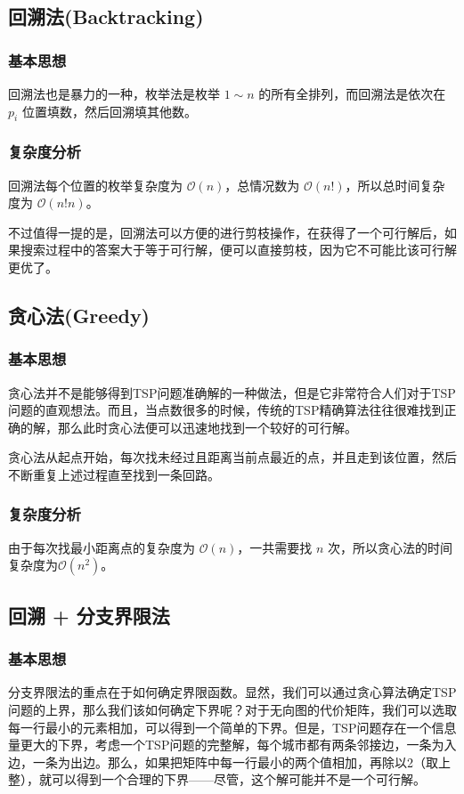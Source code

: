 \documentclass[lang=cn,11pt,a4paper]{elegantpaper}
\begin{document}
\subsection{回溯法(Backtracking)}
\subsubsection{基本思想}
回溯法也是暴力的一种，枚举法是枚举 $1 \sim n$ 的所有全排列，而回溯法是依次在 $p_i$ 位置填数，然后回溯填其他数。

\subsubsection{复杂度分析}
回溯法每个位置的枚举复杂度为 $\mathcal{O}\left(n\right)$，总情况数为 $\mathcal{O}\left(n!\right)$，所以总时间复杂度为 $\mathcal{O}\left(n!n\right)$。

不过值得一提的是，回溯法可以方便的进行剪枝操作，在获得了一个可行解后，如果搜索过程中的答案大于等于可行解，便可以直接剪枝，因为它不可能比该可行解更优了。


\subsection{贪心法(Greedy)}
\subsubsection{基本思想}
贪心法并不是能够得到TSP问题准确解的一种做法，但是它非常符合人们对于TSP问题的直观想法。而且，当点数很多的时候，传统的TSP精确算法往往很难找到正确的解，那么此时贪心法便可以迅速地找到一个较好的可行解。

贪心法从起点开始，每次找未经过且距离当前点最近的点，并且走到该位置，然后不断重复上述过程直至找到一条回路。
\subsubsection{复杂度分析}
由于每次找最小距离点的复杂度为 $\mathcal{O}\left(n\right)$，一共需要找 $n$ 次，所以贪心法的时间复杂度为$\mathcal{O}\left(n^2\right)$。


\subsection{回溯 + 分支界限法}
\subsubsection{基本思想}
分支界限法的重点在于如何确定界限函数。显然，我们可以通过贪心算法确定TSP问题的上界，那么我们该如何确定下界呢？对于无向图的代价矩阵，我们可以选取每一行最小的元素相加，可以得到一个简单的下界。但是，TSP问题存在一个信息量更大的下界，考虑一个TSP问题的完整解，每个城市都有两条邻接边，一条为入边，一条为出边。那么，如果把矩阵中每一行最小的两个值相加，再除以2（取上整），就可以得到一个合理的下界——尽管，这个解可能并不是一个可行解。
\end{document}
